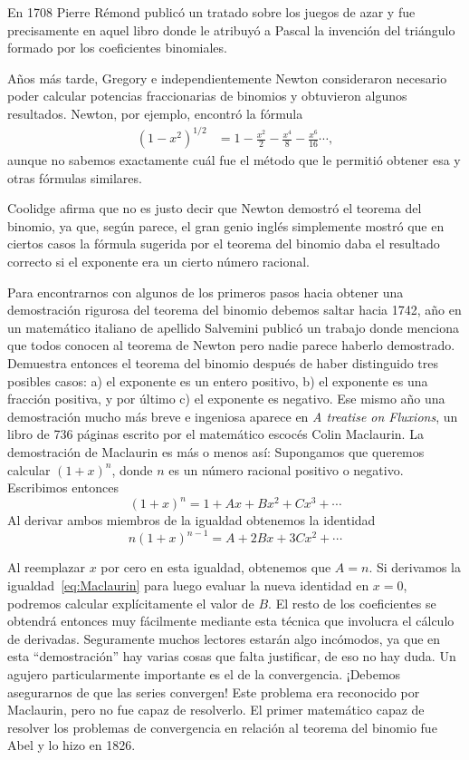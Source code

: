 En 1708
Pierre Rémond publicó un tratado sobre los juegos de azar y fue precisamente en
aquel libro donde le atribuyó a Pascal la invención del triángulo formado por
los coeficientes binomiales. 

Años más tarde, Gregory e independientemente Newton consideraron necesario
poder calcular potencias fraccionarias de binomios y obtuvieron algunos
resultados. Newton, por ejemplo, encontró la fórmula
\begin{align*}
	(1-x^2)^{1/2}&=1-\frac{x^2}{2}-\frac{x^4}{8}-\frac{x^6}{16}\cdots,
\end{align*}
aunque no sabemos exactamente cuál fue el método que le permitió obtener esa y
otras fórmulas similares. 

Coolidge afirma que no es justo decir que Newton
demostró el teorema del binomio, ya que, según parece, el gran genio inglés
simplemente mostró que en ciertos casos la fórmula sugerida por el teorema
del binomio daba el resultado correcto si el exponente era un cierto número
racional. 

Para encontrarnos con algunos de los primeros pasos hacia obtener una
demostración rigurosa del teorema del binomio debemos saltar hacia 1742, año en
un matemático italiano de apellido Salvemini publicó un trabajo donde menciona
que todos conocen al teorema de Newton pero nadie parece haberlo demostrado.
Demuestra entonces el teorema del binomio después de haber distinguido tres
posibles casos: a) el exponente es un entero positivo, b) el exponente es una
fracción positiva, y por último c) el exponente es negativo. Ese mismo año una
demostración mucho más breve e ingeniosa aparece en \emph{A treatise on
Fluxions}, un libro de 736 páginas escrito por el matemático escocés Colin
Maclaurin. La demostración de Maclaurin es más o menos así: Supongamos que
queremos calcular $(1+x)^n$, donde $n$ es un número racional positivo o
negativo. Escribimos entonces
\[
	(1+x)^n=1+Ax+Bx^2+Cx^3+\cdots
\]
Al derivar ambos miembros de la igualdad obtenemos la identidad
\begin{equation}
	\label{eq:Maclaurin}
	n(1+x)^{n-1}=A+2Bx+3Cx^2+\cdots
\end{equation}

Al reemplazar $x$ por cero en esta igualdad, obtenemos que $A=n$. Si derivamos
la igualdad~\eqref{eq:Maclaurin} para luego evaluar la nueva identidad en
$x=0$, podremos calcular explícitamente el valor de $B$. El resto de los
coeficientes se obtendrá entonces muy fácilmente mediante esta técnica que
involucra el cálculo de derivadas. Seguramente muchos lectores estarán algo incómodos, ya que 
en esta ``demostración'' hay varias cosas
que falta justificar, de eso no hay duda. Un agujero particularmente importante
es el de la convergencia. ¡Debemos asegurarnos de que las series convergen!
Este problema era reconocido por Maclaurin, pero no fue capaz de resolverlo. El
primer matemático capaz de resolver los problemas de convergencia 
en relación al teorema del binomio fue Abel y lo hizo en
1826. 



